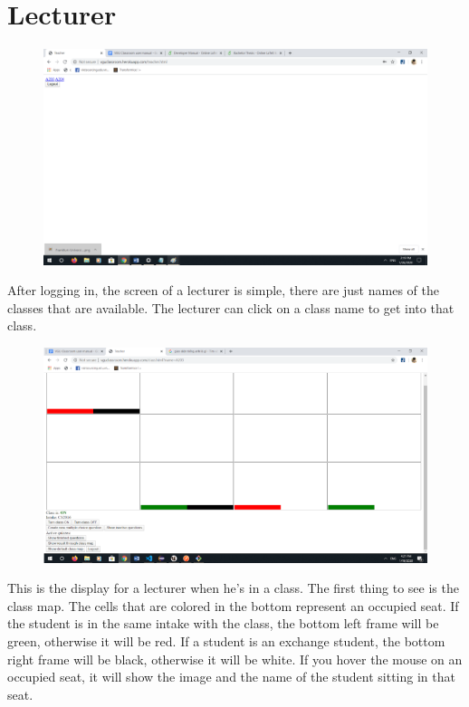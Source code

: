 \documentclass[a4paper, 11pt,openany]{book} %
\begin{document}
\section{Lecturer}
\begin{figure}[H]
    \centering
    \includegraphics[width=\textwidth,height=\textheight,keepaspectratio]{images/5.png}
\end{figure}
After logging in, the screen of a lecturer is simple, there are just names of the classes that are available. The lecturer can click on a class name to get into that class.
\begin{figure}[H]
    \centering
    \includegraphics[width=\textwidth,height=\textheight,keepaspectratio]{images/6.png}
\end{figure}
This is the display for a lecturer when he’s in a class. The first thing to see is the class map. The cells that are colored in the bottom represent an occupied seat. If the student is in the same intake with the class, the bottom left frame will be green, otherwise it will be red. If a student is an exchange student, the bottom right frame will be black, otherwise it will be white. If you hover the mouse on an occupied seat, it will show the image and the name of the student sitting in that seat.
\end{document}
